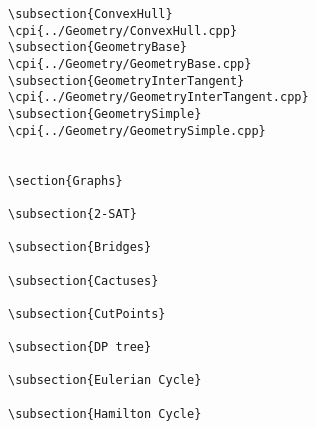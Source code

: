 {\begin{verbatim}
\subsection{ConvexHull}
\cpi{../Geometry/ConvexHull.cpp}
\subsection{GeometryBase}
\cpi{../Geometry/GeometryBase.cpp}
\subsection{GeometryInterTangent}
\cpi{../Geometry/GeometryInterTangent.cpp}
\subsection{GeometrySimple}
\cpi{../Geometry/GeometrySimple.cpp}


\section{Graphs}

\subsection{2-SAT}

\subsection{Bridges}

\subsection{Cactuses}

\subsection{CutPoints}

\subsection{DP tree}

\subsection{Eulerian Cycle}

\subsection{Hamilton Cycle}


\end{verbatim}}
